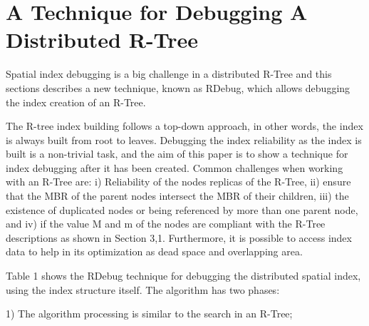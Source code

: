 \section{A Technique for Debugging A Distributed R-Tree}
\label{sec:rdebug}

	Spatial index debugging is a big challenge in a distributed R-Tree and this sections describes a new technique, known as RDebug, which allows debugging the index creation of an R-Tree.
	
	The R-tree index building follows a top-down approach, in other words, the index is always built from root to leaves. Debugging the index reliability as the index is built is a non-trivial task, and the aim of this paper is to show a technique for index debugging after it has been created. Common challenges when working with an R-Tree are: i) Reliability of the nodes replicas of the R-Tree, ii) ensure that the MBR of the parent nodes intersect the MBR of their children, iii) the existence of duplicated nodes or being referenced by more than one parent node, and iv) if the value M and m of the nodes are compliant with the R-Tree descriptions as shown in Section 3,1. Furthermore, it is possible to access index data to help in its optimization as dead space and overlapping area.

	Table 1 shows the RDebug technique for debugging the distributed spatial index, using the index structure itself. The algorithm has two phases:

1) The algorithm processing is similar to the search in an R-Tree;

